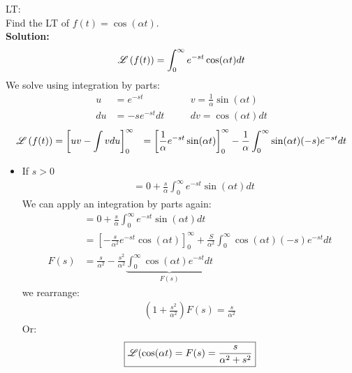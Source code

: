 \begin{exmp}{LT:}\\
Find the LT of $f(t)=\cos( \alpha t)$.\\
\textbf{Solution:}
\begin{align*}
\operatorname{\mathscr{L}}\left( f(t) \right) &=\int^\infty_0 e^{-st} \cos( \alpha t) dt\\
\end{align*}
We solve using integration by parts:
\begin{align*}
u &=e^{-st} \qquad \qquad & v=\frac{1}{\alpha} \sin(\alpha t)\\
du&=-s e^{-st}dt & dv=\cos(\alpha t) dt
\end{align*}
\begin{align*}
\operatorname{\mathscr{L}}\left( f(t) \right) &=\left[uv-\int v du\right]^\infty_0
&=\left[\frac{1}{\alpha} e^{-st}\sin( \alpha t)\right]^\infty_0-\frac{1}{\alpha}\int^\infty_0 \sin(\alpha t)(-s) e^{-st}dt
\end{align*}
\begin{itemize}
\item If $s>0$
\begin{align*}
 &=0+\frac{s}{\alpha}\int^\infty_0 e^{-st}\sin(\alpha t) dt
\end{align*}
We can apply an integration by parts again:
\begin{align*}
 &=0+\frac{s}{\alpha}\int^\infty_0 e^{-st}\sin(\alpha t) dt\\
 &=\left[-\frac{s}{\alpha^2}e^{-st}\cos(\alpha t)\right]^\infty_0+\frac{S}{\alpha^2} \int^\infty_0 \cos(\alpha t)(-s)e^{-st}dt\\
 F(s)&= \frac{s}{\alpha^2}-\frac{s^2}{\alpha^2}\underbrace{\int^\infty_0 \cos(\alpha t)e^{-st}dt}_{F(s)}
\end{align*}
we rearrange:
\begin{align*}
 \left(1+\frac{s^2}{\alpha^2}\right)F(s)= \frac{s}{\alpha^2}
\end{align*}
Or:
\begin{align*}
\boxed{ \operatorname{\mathscr{L}}(\cos(\alpha t) =F(s) =\frac{s}{\alpha^2+s^2}}
\end{align*}
\end{itemize}
\end{exmp}


